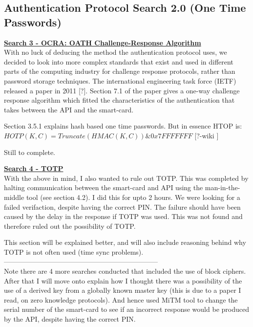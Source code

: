 \documentclass[bsc,frontabs,twoside,singlespacing,parskip,deptreport]{infthesis}     %
\begin{document}
\subsection{Authentication Protocol Search 2.0 (One Time Passwords)}

\textbf{\underline{Search 3 - OCRA: OATH Challenge-Response Algorithm}}\\
With no luck of deducing the method the authentication protocol uses, we decided to look into more complex standards that exist and used in different parts of the computing industry for challenge response protocols, rather than password storage techniques. The international engineering task force (IETF) released a paper in 2011 [?]. Section 7.1 of the paper gives a one-way challenge response algorithm which fitted the characteristics of the authentication that takes between the API and the smart-card.

Section 3.5.1 explains hash based one time passwords. But in essence HTOP is:\\
$HOTP(K,C) = Truncate(HMAC(K,C)) \& 0x7FFFFFFF$ [?-wiki ]

Still to complete.


\textbf{\underline{Search 4 - TOTP}}\\
With the above in mind, I also wanted to rule out TOTP. This was completed by halting communication between the smart-card and API using the man-in-the-middle tool (see section 4.2). I did this for upto 2 hours. We were looking for a failed verifaction, despite having the correct PIN. The failure should have been caused by the delay in the response if TOTP was used. This was not found and therefore ruled out the possibility of TOTP. 

This section will be explained better, and will also include reasoning behind why TOTP is not often used (time sync problems). \\

--------------------------------------------------------------------\\
Note there are 4 more searches conducted that included the use of block ciphers.\\
After that I will move onto explain how I thought there was a possibility of the use of a derived key from a globally known master key (this is due to a paper I read, on zero knowledge protocols). And hence used MiTM tool to change the serial number of the smart-card to see if an incorrect response would be produced by the API, despite having the correct PIN.\\
\end{document}

